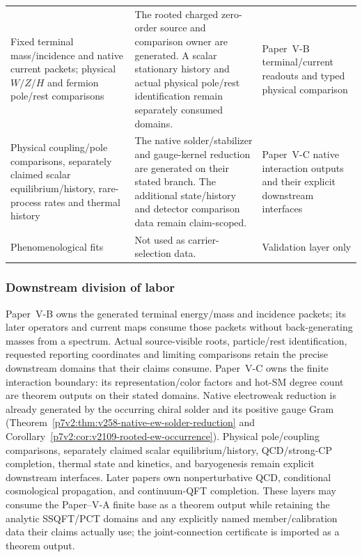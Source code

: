 \documentclass[12pt,a4paper]{article}
\begin{document}
\begin{table}[H]
\begin{tabularx}{\textwidth}{>{\raggedright\arraybackslash}p{}
                                >{\raggedright\arraybackslash}X
                                >{\raggedright\arraybackslash}p{}}
Fixed terminal mass/incidence and native current packets; physical
\(W/Z/H\) and fermion pole/rest comparisons & The rooted charged
zero-order source and comparison owner are generated. A scalar stationary
history and actual physical pole/rest identification remain separately
consumed domains. & Paper~V-B terminal/current readouts and typed physical
comparison \\
Physical coupling/pole comparisons, separately claimed scalar equilibrium/history,
rare-process rates and thermal history & The native solder/stabilizer and gauge-kernel
reduction are generated on their stated branch. The additional state/history and
detector comparison data remain claim-scoped. & Paper~V-C native interaction
outputs and their explicit downstream interfaces \\
Phenomenological fits & Not used as carrier-selection data. & Validation layer only \\
\bottomrule
\end{tabularx}
\end{table}

\subsubsection{Downstream division of labor}
Paper~V-B owns the generated terminal energy/mass and incidence packets;
its later operators and current maps consume those packets without
back-generating masses from a spectrum. Actual source-visible roots,
particle/rest identification, requested reporting coordinates and limiting
comparisons retain the precise downstream domains that their claims consume.  Paper~V-C owns the finite interaction boundary:
its representation/color factors and hot-SM degree count are theorem outputs
on their stated domains. Native electroweak reduction is already generated
by the occurring chiral solder and its positive gauge Gram
(Theorem~\ref{p7v2:thm:v258-native-ew-solder-reduction} and
Corollary~\ref{p7v2:cor:v2109-rooted-ew-occurrence}). Physical pole/coupling
comparisons, separately claimed scalar equilibrium/history,
QCD/strong-CP completion, thermal state and kinetics, and
baryogenesis remain explicit downstream interfaces.  Later papers own
nonperturbative QCD, conditional cosmological propagation, and continuum-QFT
completion.  These layers may consume the Paper--V-A finite base as a theorem
output while retaining the analytic SSQFT/PCT domains and any explicitly named
member/calibration data their claims actually use; the joint-connection certificate is
imported as a theorem output.
\end{document}
